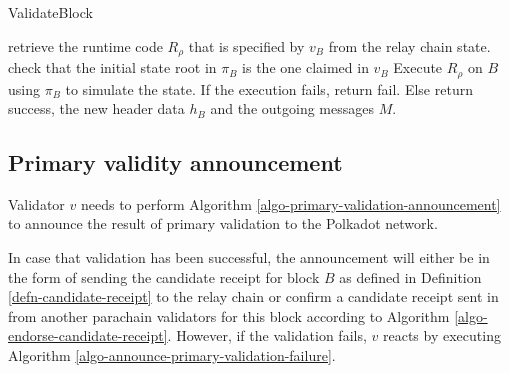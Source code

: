 \begin{algorithm}
  \caption[]{\sc ValidateBlock}
  \label{algo-validate-block}
  \begin{algorithmic}[1]
    \State retrieve the runtime code $R_\rho$ that is specified by $v_B$ from the relay chain state.
    \State check that the initial state root in $\pi_B$ is the one claimed in $v_B$
    \State Execute $R_\rho$ on $B$ using $\pi_B$ to simulate the state.
    \State If the execution fails, return fail.
    \State Else return success, the new header data $h_B$ and the outgoing messages $M$. 
  \end{algorithmic}
\end{algorithm}

\subsection{Primary validity announcement}
\label{sect-primary-validaty-announcement}
Validator $v$ needs to perform Algorithm \ref{algo-primary-validation-announcement} to announce the result of primary validation to the Polkadot network.
\newline

In case that validation has been successful, the announcement will either be in the form of sending the candidate receipt for block $B$ as defined in Definition \ref{defn-candidate-receipt} to the relay chain or confirm a candidate receipt sent in from another parachain validators for this block according to Algorithm \ref{algo-endorse-candidate-receipt}.
However, if the validation fails, $v$ reacts by executing Algorithm \ref{algo-announce-primary-validation-failure}.

